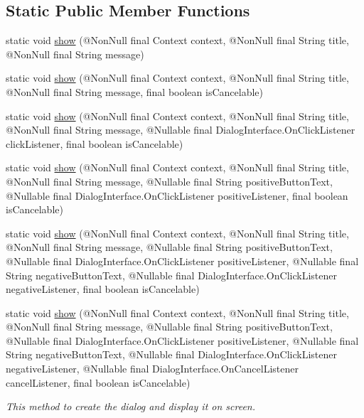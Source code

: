 \subsection*{Static Public Member Functions}
\begin{DoxyCompactItemize}
\item 
static void \hyperlink{classcom_1_1toast_1_1android_1_1gamebase_1_1base_1_1ui_1_1_simple_alert_dialog_a58c0197790a8ffa2466fd3c036ddcc4e}{show} (@Non\+Null final Context context, @Non\+Null final String title, @Non\+Null final String message)
\item 
static void \hyperlink{classcom_1_1toast_1_1android_1_1gamebase_1_1base_1_1ui_1_1_simple_alert_dialog_ae4ff10da4393b7fabc3105e1174fd81e}{show} (@Non\+Null final Context context, @Non\+Null final String title, @Non\+Null final String message, final boolean is\+Cancelable)
\item 
static void \hyperlink{classcom_1_1toast_1_1android_1_1gamebase_1_1base_1_1ui_1_1_simple_alert_dialog_a031f7fecb54ba0724285ad5f9c991913}{show} (@Non\+Null final Context context, @Non\+Null final String title, @Non\+Null final String message, @Nullable final Dialog\+Interface.\+On\+Click\+Listener click\+Listener, final boolean is\+Cancelable)
\item 
static void \hyperlink{classcom_1_1toast_1_1android_1_1gamebase_1_1base_1_1ui_1_1_simple_alert_dialog_a19e406a26de22bbc95ff8cb38a20cdb8}{show} (@Non\+Null final Context context, @Non\+Null final String title, @Non\+Null final String message, @Nullable final String positive\+Button\+Text, @Nullable final Dialog\+Interface.\+On\+Click\+Listener positive\+Listener, final boolean is\+Cancelable)
\item 
static void \hyperlink{classcom_1_1toast_1_1android_1_1gamebase_1_1base_1_1ui_1_1_simple_alert_dialog_a497ac9cb638d7a7b3dc33cae5f7ff39c}{show} (@Non\+Null final Context context, @Non\+Null final String title, @Non\+Null final String message, @Nullable final String positive\+Button\+Text, @Nullable final Dialog\+Interface.\+On\+Click\+Listener positive\+Listener, @Nullable final String negative\+Button\+Text, @Nullable final Dialog\+Interface.\+On\+Click\+Listener negative\+Listener, final boolean is\+Cancelable)
\item 
static void \hyperlink{classcom_1_1toast_1_1android_1_1gamebase_1_1base_1_1ui_1_1_simple_alert_dialog_a71cfaa3637e0e2e692d6defa95aa2b56}{show} (@Non\+Null final Context context, @Non\+Null final String title, @Non\+Null final String message, @Nullable final String positive\+Button\+Text, @Nullable final Dialog\+Interface.\+On\+Click\+Listener positive\+Listener, @Nullable final String negative\+Button\+Text, @Nullable final Dialog\+Interface.\+On\+Click\+Listener negative\+Listener, @Nullable final Dialog\+Interface.\+On\+Cancel\+Listener cancel\+Listener, final boolean is\+Cancelable)
\begin{DoxyCompactList}\small\item\em This method to create the dialog and display it on screen. \end{DoxyCompactList}\end{DoxyCompactItemize}


